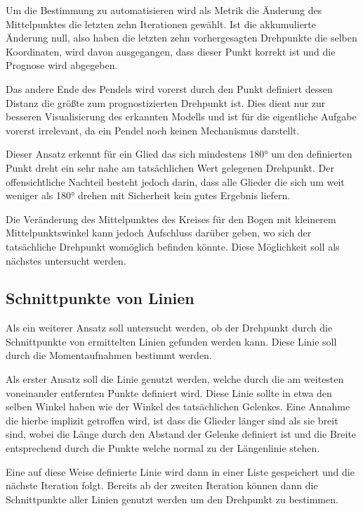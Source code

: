 Um die Bestimmung zu automatisieren wird als Metrik die Änderung des Mittelpunktes die letzten zehn Iterationen gewählt.
Ist die akkumulierte Änderung null, also haben die letzten zehn vorhergesagten Drehpunkte die selben Koordinaten, wird davon ausgegangen, dass dieser Punkt korrekt ist und die Prognose wird abgegeben.

Das andere Ende des Pendels wird vorerst durch den Punkt definiert dessen Distanz die größte zum prognostizierten Drehpunkt ist.
Dies dient nur zur besseren Visualisierung des erkannten Modells und ist für die eigentliche Aufgabe vorerst irrelevant, da ein Pendel noch keinen Mechanismus darstellt.


Dieser Ansatz erkennt für ein Glied das sich mindestens 180° um den definierten Punkt dreht ein sehr nahe am tatsächlichen Wert gelegenen Drehpunkt.
Der offensichtliche Nachteil besteht jedoch darin, dass alle Glieder die sich um weit weniger als 180° drehen mit Sicherheit kein gutes Ergebnis liefern.

Die Veränderung des Mittelpunktes des Kreises für den Bogen mit kleinerem Mittelpunktswinkel kann jedoch Aufschluss darüber geben, wo sich der tatsächliche Drehpunkt womöglich befinden könnte.
Diese Möglichkeit soll als nächstes untersucht werden.

\subsection{Schnittpunkte von Linien}

Als ein weiterer Ansatz soll untersucht werden, ob der Drehpunkt durch die Schnittpunkte von ermittelten Linien gefunden werden kann.
Diese Linie soll durch die Momentaufnahmen bestimmt werden.

Als erster Ansatz soll die Linie genutzt werden, welche durch die am weitesten voneinander entfernten Punkte definiert wird.
Diese Linie sollte in etwa den selben Winkel haben wie der Winkel des tatsächlichen Gelenkes.
Eine Annahme die hierbe implizit getroffen wird, ist dass die Glieder länger sind als sie breit sind, wobei die Länge durch den Abstand der Gelenke definiert ist und die Breite entsprechend durch die Punkte welche normal zu der Längenlinie stehen.

Eine auf diese Weise definierte Linie wird dann in einer Liste gespeichert und die nächste Iteration folgt.
Bereits ab der zweiten Iteration können dann die Schnittpunkte aller Linien genutzt werden um den Drehpunkt zu bestimmen.

